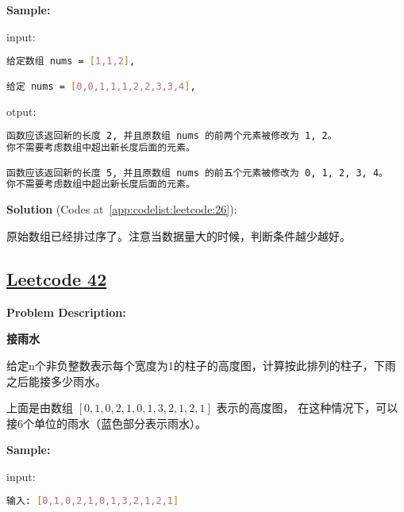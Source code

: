 \textbf{Sample:}\par

input:\par

\begin{lstlisting}[language=bash]
给定数组 nums = [1,1,2], 

给定 nums = [0,0,1,1,1,2,2,3,3,4],
\end{lstlisting}

otput:\par

\begin{lstlisting}[language=bash]
函数应该返回新的长度 2, 并且原数组 nums 的前两个元素被修改为 1, 2。 
你不需要考虑数组中超出新长度后面的元素。

函数应该返回新的长度 5, 并且原数组 nums 的前五个元素被修改为 0, 1, 2, 3, 4。
你不需要考虑数组中超出新长度后面的元素。
\end{lstlisting}

\textbf{Solution }(Codes at~\ref{app:codelist:leetcode:26}):\par

原始数组已经排过序了。注意当数据量大的时候，判断条件越少越好。\par



\subsection{\href{https://leetcode-cn.com/}{Leetcode 42}}\label{app:problemlist:leetcode:42}

\textbf{Problem Description:}\par

\textbf{接雨水}\par

给定n个非负整数表示每个宽度为1的柱子的高度图，计算按此排列的柱子，下雨之后能接多少雨水。\par

上面是由数组 $ [0,1,0,2,1,0,1,3,2,1,2,1] $ 表示的高度图，
在这种情况下，可以接6个单位的雨水（蓝色部分表示雨水）。\par


\textbf{Sample:}\par

input:\par

\begin{lstlisting}[language=bash]
输入: [0,1,0,2,1,0,1,3,2,1,2,1]
\end{lstlisting}

